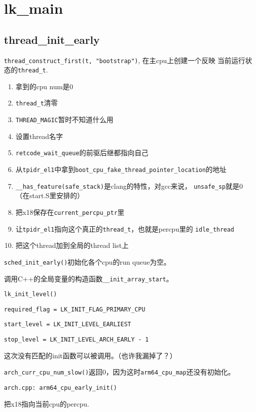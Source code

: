 \section{lk\_main}

\subsection{thread\_init\_early}

\verb|thread_construct_first(t, "bootstrap")|, 在主cpu上创建一个反映
当前运行状态的\verb|thread_t|.

\begin{enumerate}
    \item 拿到的cpu num是0
    \item \verb|thread_t|清零
    \item \verb|THREAD_MAGIC|暂时不知道什么用
    \item 设置thread名字
    \item \verb|retcode_wait_queue|的前驱后继都指向自己
    \item 从\verb|tpidr_el1|中拿到\verb|boot_cpu_fake_thread_pointer_location|的地址

    \item \verb|__has_feature(safe_stack)|是clang的特性，对gcc来说，
        \verb|unsafe_sp|就是0（在start.S里安排的）
    \item 把x18保存在\verb|current_percpu_ptr|里
    \item 让\verb|tpidr_el1|指向这个真正的\verb|thread_t|，也就是percpu里的
    \verb|idle_thread|
    \item 把这个thread加到全局的thread list上
\end{enumerate}


\verb|sched_init_early()|初始化各个cpu的run queue为空。

调用C++的全局变量的构造函数\verb|__init_array_start|。

\verb|lk_init_level()|

\verb|required_flag = LK_INIT_FLAG_PRIMARY_CPU|

\verb|start_level = LK_INIT_LEVEL_EARLIEST|

\verb|stop_level = LK_INIT_LEVEL_ARCH_EARLY - 1|

这次没有匹配的init函数可以被调用。（也许我漏掉了？）

\verb|arch_curr_cpu_num_slow()|返回0，因为这时\verb|arm64_cpu_map|还没有初始化。

\verb|arch.cpp: arm64_cpu_early_init()|

把x18指向当前cpu的percpu.

